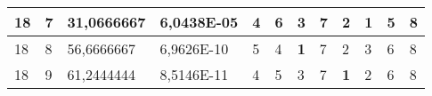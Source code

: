 \documentclass[conference]{IEEEtran}
\begin{document}
\begin{table*}[]
\begin{tabular}{|llll|llllllll|}
\multicolumn{1}{|l|}{18}                                                    & \multicolumn{1}{l|}{7}                                                        & \multicolumn{1}{l|}{31,0666667}                                                   & 6,0438E-05                     & \multicolumn{1}{l|}{4}                                                  & \multicolumn{1}{l|}{6}                                                  & \multicolumn{1}{l|}{3}                                                  & \multicolumn{1}{l|}{7}                                                  & \multicolumn{1}{l|}{2}                                                  & \multicolumn{1}{l|}{\textbf{1}}                                         & \multicolumn{1}{l|}{5}                                                  & 8                          \\ \hline
\multicolumn{1}{|l|}{18}                                                    & \multicolumn{1}{l|}{8}                                                        & \multicolumn{1}{l|}{56,6666667}                                                   & 6,9626E-10                     & \multicolumn{1}{l|}{5}                                                  & \multicolumn{1}{l|}{4}                                                  & \multicolumn{1}{l|}{\textbf{1}}                                         & \multicolumn{1}{l|}{7}                                                  & \multicolumn{1}{l|}{2}                                                  & \multicolumn{1}{l|}{3}                                                  & \multicolumn{1}{l|}{6}                                                  & 8                          \\ \hline
\multicolumn{1}{|l|}{18}                                                    & \multicolumn{1}{l|}{9}                                                        & \multicolumn{1}{l|}{61,2444444}                                                   & 8,5146E-11                     & \multicolumn{1}{l|}{4}                                                  & \multicolumn{1}{l|}{5}                                                  & \multicolumn{1}{l|}{3}                                                  & \multicolumn{1}{l|}{7}                                                  & \multicolumn{1}{l|}{\textbf{1}}                                         & \multicolumn{1}{l|}{2}                                                  & \multicolumn{1}{l|}{6}                                                  & 8                          \\ \hline

\end{tabular}
\end{table*}
\end{document}

